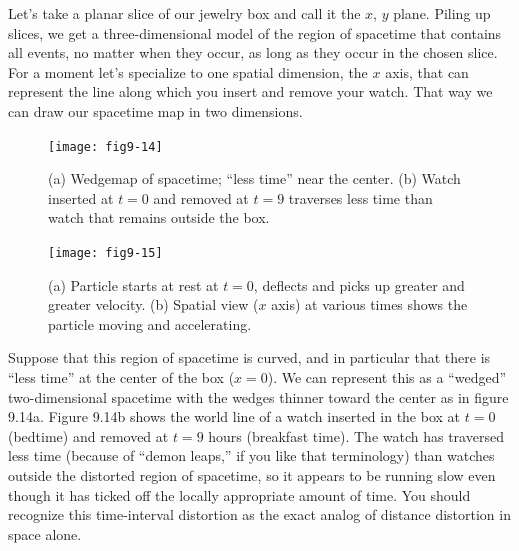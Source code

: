 \documentclass{book}
\begin{document}
Let's take a planar slice of our jewelry box and call it the $x$, $y$ plane.
Piling up slices, we get a three-dimensional model of the region of
spacetime that contains all events, no matter when they occur, as long
as they occur in the chosen slice. For a moment let's specialize to one
spatial dimension, the $x$ axis, that can represent the line along which
you insert and remove your watch. That way we can draw our spacetime
map in two dimensions.

\begin{figure}
\begin{center}
\texttt{[image: fig9-14]}
\caption{(a) Wedgemap of spacetime; ``less time'' near the center. (b) Watch inserted at $t = 0$ and removed at $t = 9$ traverses less time than watch that remains outside the box.}
\end{center}
\end{figure}

\begin{figure}
\begin{center}
\texttt{[image: fig9-15]}
\caption{(a) Particle starts at rest at $t = 0$, deflects and picks up greater and greater velocity. (b) Spatial view ($x$ axis) at various times shows the particle moving and accelerating.}
\end{center}
\end{figure}

Suppose that this region of spacetime is curved, and in particular that
there is ``less time'' at the center of the box ($x = 0$). We can represent
this as a ``wedged'' two-dimensional spacetime with the wedges thinner
toward the center as in figure 9.14a. Figure 9.14b shows the world line
of a watch inserted in the box at $t = 0$ (bedtime) and removed at $t =
9$ hours (breakfast time). The watch has traversed less time (because
of ``demon leaps,'' if you like that terminology) than watches outside
the distorted region of spacetime, so it appears to be running slow even
though it has ticked off the locally appropriate amount of time. You
should recognize this time-interval distortion as the exact analog of
distance distortion in space alone.
\end{document}
